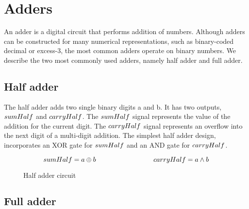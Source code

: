 \section{Adders}

An adder is a digital circuit that performs addition of numbers.
Although adders can be constructed for many numerical representations, such as binary-coded decimal or excess-3, the most common adders operate on binary numbers. We describe the two most commonly used 
adders, namely half adder and full adder.

\subsection{Half adder}

The half adder adds two single binary digits a and b. It has two outputs, $sumHalf$ and $carryHalf$. The $sumHalf$ signal represents the value of the addition for the current digit. The $carryHalf$ signal represents an overflow into the next digit of a multi-digit addition.
The simplest half adder design, incorporates an XOR gate for $sumHalf$ and an AND gate for $carryHalf$.

\[
\sumOfHalfAdder = a \oplus b \hspace{3 cm} \carryOfHalfAdder = a \land b 
\]

\begin{figure}[h]
\usetikzlibrary[arrows]
\centering
{}
\caption{Half adder circuit}
\end{figure}

\subsection{Full adder}

